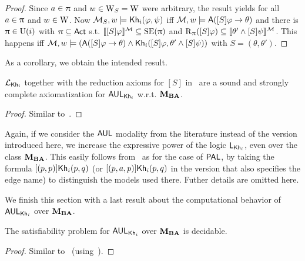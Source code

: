 \begin{proof}
	Since $a \in \uppi$ and $w \in \operatorname{W}_{{S}} = \operatorname{W}$ were arbitrary, the result yields for all $a \in \uppi$ and $w \in \operatorname{W}$.
	Now $\mathcal{M}_{{S}},w \models {\sf Kh}_i(\varphi,\psi)$ iff $\mathcal{M},w \models {\sf A}([S]\varphi \rightarrow \theta)$ and there is $\uppi \in \operatorname{U}(i)$ with $\uppi \subseteq {\rm \sf Act}$ s.t. $\llbracket [S]\varphi \rrbracket^{\mathcal{M}} \subseteq \operatorname{SE}(\uppi)$ and $\operatorname{R}_\uppi([S]\varphi) \subseteq \llbracket \theta' \wedge [S]\psi \rrbracket^{\mathcal{M}}$.
	This happens iff $\mathcal{M},w \models ({\sf A}([S]\varphi \rightarrow \theta) \wedge {\sf Kh}_i([S]\varphi,\theta' \wedge [S]\psi))$ with $S= (\theta,\theta')$.
\end{proof}

As a corollary, we obtain the intended result.

\medskip 

\begin{theorem}\label{th:aulcomplete}
$\mathcal{L}_{{\sf Kh}_i}$ together with the reduction axioms for $[S]$ in~ are a sound and strongly complete axiomatization for $\mathsf{AUL}_{{\sf Kh}_i}$ w.r.t. $\mathbf{M}_{\mathbf{BA}}$.
\end{theorem}

\begin{proof}
Similar to~.
\end{proof}

Again, if we consider the $\mathsf{AUL}$ modality from the literature instead of the version introduced here, we increase the expressive power of the logic $\mathsf{L}_{{\sf Kh}_i}$, even over the class $\mathbf{M}_{\mathbf{BA}}$. This easily follows from~ as for the case of $\textsf{PAL}$, by taking the formula $[(p,p)]{\sf Kh}_i(p,q)$ (or $[(p,a,p)]{\sf Kh}_i(p,q)$ in the version that also specifies the edge name) to distinguish the models used there. Futher details are omitted here. 


We finish this section with a last result about the computational behavior of $\mathsf{AUL}_{{\sf Kh}_i}$ over $\mathbf{M}_{\mathbf{BA}}$.

\medskip 

\begin{corollary}\label{cor:aulsat}
The satisfiability problem for $\mathsf{AUL}_{{\sf Kh}_i}$ over $\mathbf{M}_{\mathbf{BA}}$ is decidable.
\end{corollary}
\begin{proof}
Similar to~ (using~).
\end{proof}
